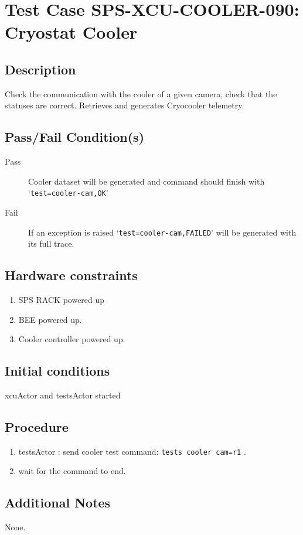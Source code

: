 \section{Test Case SPS-XCU-COOLER-090: Cryostat Cooler}

\subsection{Description}

Check the communication with the cooler of a given camera, check that the statuses are correct.
Retrieves and generates Cryocooler telemetry.

\subsection{Pass/Fail Condition(s)}

\begin{description}
\item [Pass] Cooler dataset will be generated and command should finish with `\texttt{test=cooler-cam,OK}'
\item [Fail] If an exception is raised `\texttt{test=cooler-cam,FAILED}' will be generated with its full trace.

\end{description}

\subsection{Hardware constraints}

\begin{enumerate}
    \item SPS RACK powered up
    \item BEE powered up.
    \item Cooler controller powered up.
\end{enumerate}

\subsection{Initial conditions}

xcuActor and testsActor started

\subsection{Procedure}

\begin{enumerate}
    \item testsActor : send cooler test command: \texttt{tests cooler cam=r1} .
    \item wait for the command to end.
\end{enumerate}

\subsection{Additional Notes}
None.
